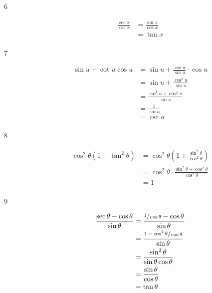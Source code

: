 \documentclass{exam}
\begin{document}
\begin{description}
      \item[6] 
        \begin{align*}
          \frac{\sec x}{\csc x} & = \frac{\sin x}{\cos x} \\
                                & = \tan x \\
        \end{align*}

      \item[7] 
        \begin{align*}
          \sin u + \cot u \cos u & = \sin u + \frac{\cos u}{\sin u} \cdot \cos u \\
                                 & = \sin u + \frac{\cos^2 u}{\sin u} \\
                                 & = \frac{\sin^2 u + \cos^2 u}{\sin u} \\
                                 & = \frac{1}{\sin u} \\
                                 & = \csc u \\
        \end{align*}

      \item[8] 
        \begin{align*}
          \cos^2 \theta \left( 1 + \tan^2 \theta \right) & = \cos^2 \theta \left( 1 + \frac{\sin^2 \theta}{\cos^2 \theta} \right) \\
                                                         & = \cos^2 \theta \cdot \frac{\sin^2 \theta + \cos^2 \theta}{\cos^2 \theta} \\
                                                         & = 1 \\
        \end{align*}

      \item[9] 
        \begin{align*}
          \frac{\sec \theta - \cos \theta}{\sin \theta} & = \frac{\sfrac{1}{\cos \theta} - \cos \theta}{\sin \theta} \\
                                                        & = \frac{\sfrac{1 - \cos^2 \theta}{\cos \theta}}{\sin \theta} \\
                                                        & = \frac{\sin^2 \theta}{\sin \theta \cos \theta} \\
                                                        & = \frac{\sin \theta}{\cos \theta} \\
                                                        & = \tan \theta \\
        \end{align*}


\end{description}
\end{document}

